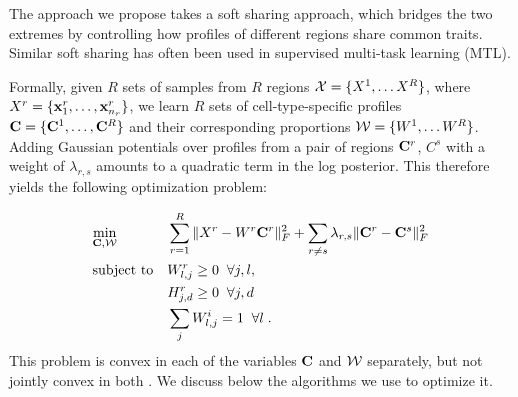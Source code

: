 The approach we propose takes a soft sharing approach, which bridges the two extremes by controlling how profiles of different regions share common traits. Similar soft sharing has often been used in supervised multi-task learning (MTL).


Formally, given $R$ sets of samples from $R$ regions ${\cal{X}} = \{X^1,\ldots X^R\}$, where $X^r = \{\mathbf{x}^r_1, \ldots, \mathbf{x}^r_{n_r} \}$, we learn $R$ sets of cell-type-specific profiles ${\cal{\mathbf{C}}} = \{\mathbf{C}^1,\ldots, \mathbf{C}^R\}$ and their corresponding proportions ${\cal{W}} = \{ W^1,\ldots W^R\}$. Adding Gaussian potentials over profiles from a pair of regions $\mathbf{C}^r$, $C^s$ with a weight of $\lambda_{r,s}$ amounts to a quadratic term in the log posterior. This therefore yields the following optimization problem: 


\begin{equation*}
    \label{eq-multi}
    \begin{aligned}
        & \underset{\cal{\mathbf{C}},\cal{W}}{\text{min}}  
        & & \sum_{r=1}^R  \| X^r - W^r \mathbf{C}^r \|_F^2+ \sum_{r \neq s}
   \lambda_{r , s} \| \mathbf{C}^r - \mathbf{C}^s \|_F^2  \\
        & \text{subject to} &
            & W^r_{l,j} \geq 0 \;\; \forall j, l, \\
        & & & H^r_{j,d} \geq 0 \;\;\forall j, d \\
        & & & \sum_j W^i_{l,j} = 1 \;\; \forall l \;. 
    \end{aligned}
\end{equation*}
This problem is convex in each of the variables $\cal{\mathbf{C}}$ and $\cal{W}$ separately, but not jointly convex in both . We discuss below the algorithms we use to optimize it.


